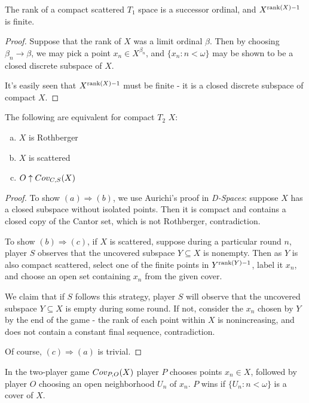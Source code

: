   \begin{proposition}
    The rank of a compact scattered $T_1$ space is a successor ordinal, and $X^{\textrm{rank}(X)-1}$ is finite.
  \end{proposition}

  \begin{proof}
    Suppose that the rank of $X$ was a limit ordinal $\beta$. Then by choosing $\beta_n\to\beta$, we may pick a point $x_n\in X^{\beta_n}$, and $\{x_n: n<\omega\}$ may be shown to be a closed discrete subspace of $X$.

    It's easily seen that $X^{\textrm{rank}(X)-1}$ must be finite - it is a closed discrete subspace of compact $X$.
  \end{proof}

  \begin{theorem}
    The following are equivalent for compact $T_2$ $X$:
      \begin{enumerate}[(a)]
        \item $X$ is Rothberger
        \item $X$ is scattered
        \item $O\uparrow Cov_{C,S}(X)$
      \end{enumerate}
  \end{theorem}

  \begin{proof}
    To show $(a)\Rightarrow(b)$, we use Aurichi's proof in \textit{D-Spaces}: suppose $X$ has a closed subspace without isolated points. Then it is compact and contains a closed copy of the Cantor set, which is not Rothberger, contradiction.

    To show $(b)\Rightarrow(c)$, if $X$ is scattered, suppose during a particular round $n$, player $S$ observes that the uncovered subspace $Y \subseteq X$ is nonempty. Then as $Y$ is also compact scattered,  select one of the finite points in $Y^{\textrm{rank}(Y)-1}$, label it $x_n$, and choose an open set containing $x_n$ from the given cover.

    We claim that if $S$ follows this strategy, player $S$ will observe that the uncovered subspace $Y\subseteq X$ is empty during some round. If not, consider the $x_n$ chosen by $Y$ by the end of the game - the rank of each point within $X$ is nonincreasing, and does not contain a constant final sequence, contradiction.

    Of course, $(c)\Rightarrow(a)$ is trivial.
  \end{proof}

  \begin{definition}
    In the two-player game $Cov_{P,O}(X)$ player $P$ chooses points $x_n\in X$, followed by player $O$ choosing an open neighborhood $U_n$ of $x_n$. $P$ wins if $\{U_n:n<\omega\}$ is a cover of $X$.
  \end{definition}

